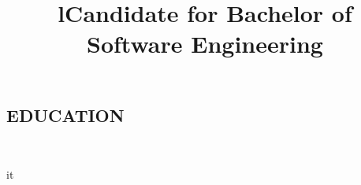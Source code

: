 \documentclass[]{res}
\begin{document}
\begin{resume}
\section{EDUCATION}
  \begin{format}  \\ \title{l}{it} \\ \body \end{format}
  \title{Candidate for Bachelor of Software Engineering}
  \begin{position}
  \end{position}
 
\end{resume}
\end{document}
